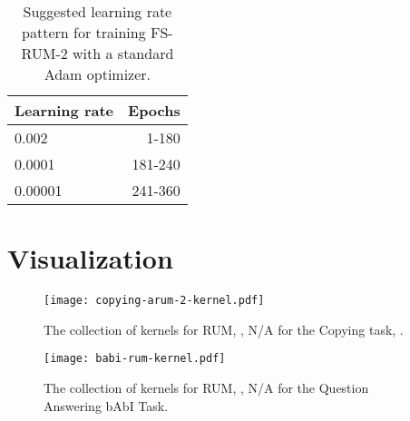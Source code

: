 \documentclass{article} \usepackage{iclr2018_conference,times}
\begin{document}
\begin{table}[h!]
\centering
\begin{tabular}{lr}
\toprule
  Learning rate & Epochs \\ 
   \hline
  0.002 & 1-180 \\ 
  0.0001 & 181-240 \\ 
  0.00001 & 241-360 \\
\bottomrule
\end{tabular}
\caption{Suggested learning rate pattern for training FS-RUM-2 with a standard Adam optimizer.}
\label{tbl:ptb:lr}
\end{table}

\section{Visualization} \label{app:sec:vis}

\begin{figure}[h]
\begin{center}
\texttt{[image: copying-arum-2-kernel.pdf]}
\end{center}
\caption{The collection of kernels for  RUM, ,  N/A for the Copying task, . 
\label{app:fig:copying-rum-kernel}}
\end{figure}

\begin{figure}[h]
\begin{center}
\texttt{[image: babi-rum-kernel.pdf]}
\end{center}
\caption{The collection of kernels for  RUM, ,  N/A for the Question Answering bAbI Task.
\label{app:fig:babi-rum-kernel}}
\end{figure}
\end{document}
